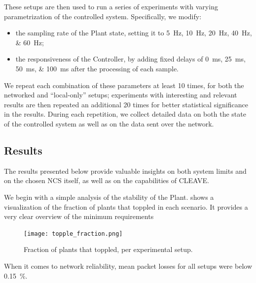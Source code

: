 These setups are then used to run a series of experiments with varying parametrization of the controlled system.
Specifically, we modify:
\begin{itemize}
    \item the sampling rate of the Plant state, setting it to \SIlist[list-units=single,list-final-separator={, or }]{5;10;20;40;60}{\hertz};
    \item the responsiveness of the Controller, by adding fixed delays of  \SIlist[list-units=single,list-final-separator={, or }]{0;25;50;100}{\milli\second} after the processing of each sample.
\end{itemize}
We repeat each combination of these parameters at least \num{10} times, for both the networked and ``local-only'' setups; experiments with interesting and relevant results are then repeated an additional \num{20} times for better statistical significance in the results.
During each repetition, we collect detailed data on both the state of the controlled system as well as on the data sent over the network.

\subsection{Results}\label{ssec:results}

The results presented below provide valuable insights on both system limits and on the chosen \ac{NCS} itself, as well as on the capabilities of \ac{CLEAVE}.

We begin with a simple analysis of the stability of the Plant.
 shows a visualization of the fraction of plants that toppled in each scenario.
It provides a very clear overview of the minimum requirements 

\begin{figure}
    \centering
    \texttt{[image: topple\_fraction.png]}
    \caption{Fraction of plants that toppled, per experimental setup.}%
    \label{fig:topple:fraction}
\end{figure}

When it comes to network reliability, mean packet losses for all setups were below \SI{0.15}{\percent}. 
